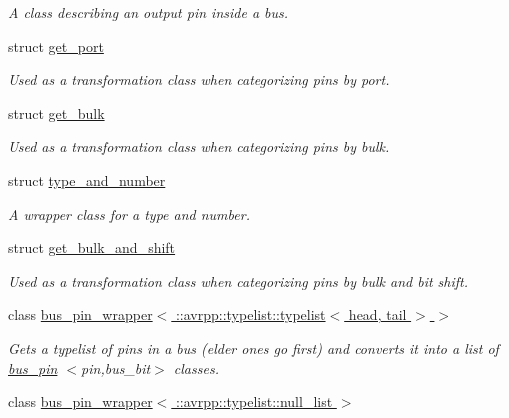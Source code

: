 \begin{DoxyCompactItemize}
\begin{DoxyCompactList}\small\item\em A class describing an output pin inside a bus. \item\end{DoxyCompactList}\item 
struct \hyperlink{structavrpp_1_1bus_1_1get__port}{get\_\-port}
\begin{DoxyCompactList}\small\item\em Used as a transformation class when categorizing pins by port. \item\end{DoxyCompactList}\item 
struct \hyperlink{structavrpp_1_1bus_1_1get__bulk}{get\_\-bulk}
\begin{DoxyCompactList}\small\item\em Used as a transformation class when categorizing pins by bulk. \item\end{DoxyCompactList}\item 
struct \hyperlink{structavrpp_1_1bus_1_1type__and__number}{type\_\-and\_\-number}
\begin{DoxyCompactList}\small\item\em A wrapper class for a type and number. \item\end{DoxyCompactList}\item 
struct \hyperlink{structavrpp_1_1bus_1_1get__bulk__and__shift}{get\_\-bulk\_\-and\_\-shift}
\begin{DoxyCompactList}\small\item\em Used as a transformation class when categorizing pins by bulk and bit shift. \item\end{DoxyCompactList}\item 
class \hyperlink{classavrpp_1_1bus_1_1bus__pin__wrapper_3_01_1_1avrpp_1_1typelist_1_1typelist_3_01head_00_01tail_01_4_01_4}{bus\_\-pin\_\-wrapper$<$ ::avrpp::typelist::typelist$<$ head, tail $>$ $>$}
\begin{DoxyCompactList}\small\item\em Gets a typelist of pins in a bus (elder ones go first) and converts it into a list of \hyperlink{structavrpp_1_1bus_1_1bus__pin}{bus\_\-pin} $<$pin,bus\_\-bit$>$ classes. \item\end{DoxyCompactList}\item 
class \hyperlink{classavrpp_1_1bus_1_1bus__pin__wrapper_3_01_1_1avrpp_1_1typelist_1_1null__list_01_4}{bus\_\-pin\_\-wrapper$<$ ::avrpp::typelist::null\_\-list $>$}

\end{DoxyCompactItemize}
